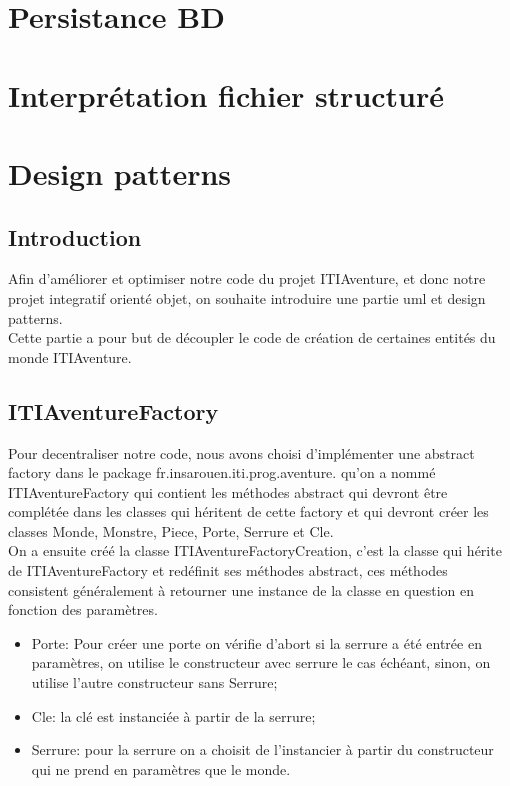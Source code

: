 \documentclass[12pt,a4paper]{report}
\begin{document}
\chapter{Persistance BD}






\chapter{Interprétation fichier structuré}


\chapter{Design patterns}
\section{Introduction}
Afin d'améliorer et optimiser notre code du projet ITIAventure, et donc notre projet integratif orienté objet, on souhaite introduire une partie uml et design patterns.
\\

Cette partie a pour but de découpler le code de création de certaines entités du monde ITIAventure.

\section{ITIAventureFactory}
Pour decentraliser notre code, nous avons choisi d'implémenter une abstract factory dans le package fr.insarouen.iti.prog.aventure. qu'on a nommé ITIAventureFactory qui contient les méthodes abstract qui devront être complétée dans les classes qui héritent de cette factory et qui devront créer les classes Monde, Monstre, Piece, Porte, Serrure et Cle. 
\\
On a ensuite créé la classe ITIAventureFactoryCreation, c'est la classe qui hérite de ITIAventureFactory et redéfinit ses méthodes abstract, ces méthodes consistent généralement à retourner une instance de la classe en question en fonction des paramètres.
\\
\begin{itemize}
\item Porte: Pour créer une porte on vérifie d'abort si la serrure a été entrée en paramètres, on utilise le constructeur avec serrure le cas échéant, sinon, on utilise l'autre constructeur sans Serrure;
\item Cle: la clé est instanciée à partir de la serrure;
\item Serrure: pour la serrure on a choisit de l'instancier à partir du constructeur qui ne prend en paramètres que le monde.
\end{itemize}
\end{document}

